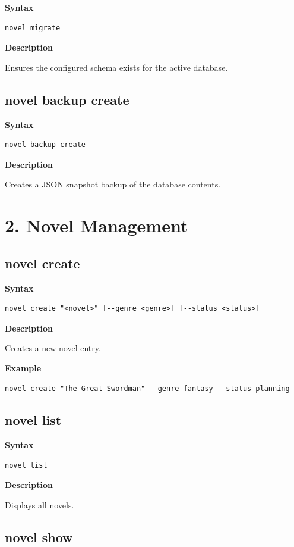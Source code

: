 \documentclass[11pt]{article}
\begin{document}
\textbf{Syntax}
\begin{verbatim}
novel migrate
\end{verbatim}

\textbf{Description}

Ensures the configured schema exists for the active database.

\subsection{novel backup create}

\textbf{Syntax}
\begin{verbatim}
novel backup create
\end{verbatim}

\textbf{Description}

Creates a JSON snapshot backup of the database contents.

\section{2. Novel Management}

\subsection{novel create}

\textbf{Syntax}
\begin{verbatim}
novel create "<novel>" [--genre <genre>] [--status <status>]
\end{verbatim}

\textbf{Description}

Creates a new novel entry.

\textbf{Example}
\begin{verbatim}
novel create "The Great Swordman" --genre fantasy --status planning
\end{verbatim}

\subsection{novel list}

\textbf{Syntax}
\begin{verbatim}
novel list
\end{verbatim}

\textbf{Description}

Displays all novels.

\subsection{novel show}
\end{document}
